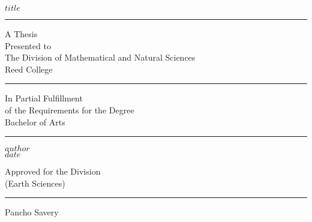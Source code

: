 

%
%
%
%
%
%
%

\begin{center}
    $title$
    \vfil
    \hrule
    \vfil
    A Thesis \\
    Presented to \\
    The Division of Mathematical and Natural Sciences \\
    Reed College
    \vfil
    \hrule
    \vfil
    In Partial Fulfillment \\
    of the Requirements for the Degree \\
    Bachelor of Arts
    \vfil
    \hrule
    \vfil
    $author$ \\
    $date$
    
    \cleardoublepage
    
    \vfil
    Approved for the Division \\
    (Earth Sciences)
    
    \bigskip
    \bigskip
    \bigskip
    \hrule
    
    \medskip
    Pancho Savery
    \vfil
\end{center}
